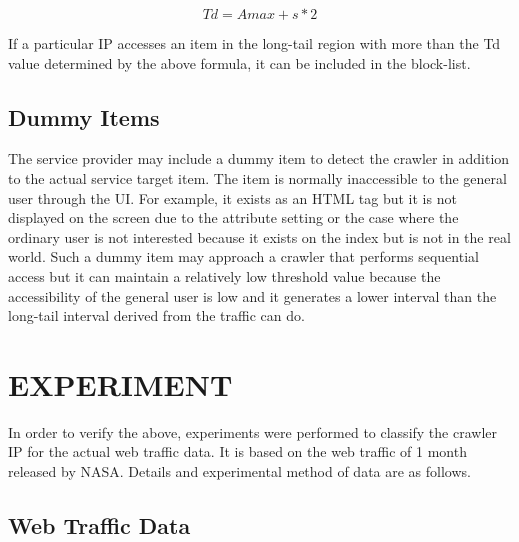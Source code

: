\documentclass[letterpaper, 10 pt, conference]{ieeeconf}
\begin{document}
  \begin{displaymath}
    Td = Amax + s * 2
  \end{displaymath}

If a particular IP accesses an item in the long-tail region with more than the Td value determined by the above formula, it can be included in the block-list.

\subsection{Dummy Items}
The service provider may include a dummy item to detect the crawler in addition to the actual service target item. The item is normally inaccessible to the general user through the UI. For example, it exists as an HTML tag but it is not displayed on the screen due to the attribute setting or the case where the ordinary user is not interested because it exists on the index but is not in the real world.
Such a dummy item may approach a crawler that performs sequential access but it can maintain a relatively low threshold value because the accessibility of the general user is low and it generates a lower interval than the long-tail interval derived from the traffic can do.



%
%
\section{EXPERIMENT}
In order to verify the above, experiments were performed to classify the crawler IP for the actual web traffic data. It is based on the web traffic of 1 month released by NASA. Details and experimental method of data are as follows.


\subsection{Web Traffic Data}
\end{document}
